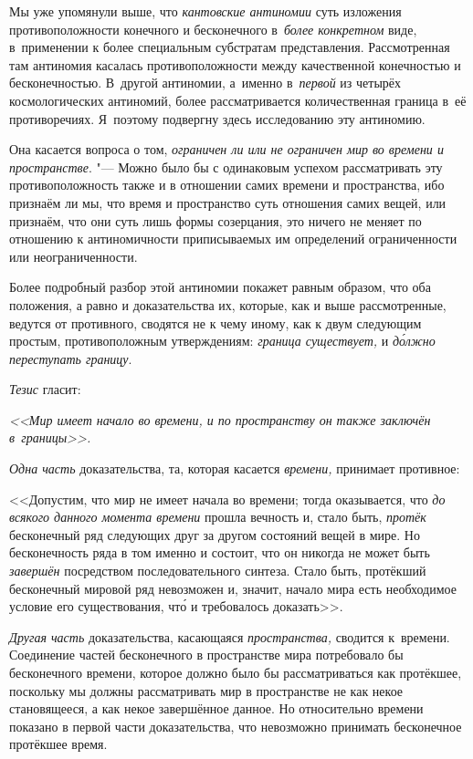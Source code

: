 Мы уже упомянули выше, что {\em кантовские антиномии} суть изложения
противоположности конечного и бесконечного в~{\em более конкретном} виде,
в~применении к более специальным субстратам представления. Рассмотренная там
антиномия касалась противоположности между качественной конечностью и
бесконечностью. В~другой антиномии, а~именно в~{\em первой} из четырёх
космологических антиномий, более рассматривается количественная граница в~её
противоречиях. Я~поэтому подвергну здесь исследованию эту антиномию.

Она касается вопроса о том,
{\em ограничен ли или не ограничен мир во времени и пространстве}. "--- Можно
было бы с одинаковым успехом рассматривать эту противоположность также
и в отношении самих времени и пространства, ибо признаём ли мы, что время
и пространство суть отношения самих вещей, или признаём, что они суть лишь
формы созерцания, это ничего не меняет по отношению к антиномичности
приписываемых им определений ограниченности или неограниченности.

Более подробный разбор этой антиномии покажет равным образом, что оба
положения, а равно и доказательства их, которые, как и выше рассмотренные,
ведутся от противного, сводятся не к чему иному, как к двум следующим простым,
противоположным утверждениям: {\em граница существует,} и
{\em д\'{о}лжно переступать границу}.

{\em Тезис} гласит:

{\em <<Мир имеет начало во времени, и по пространству он
также заключён в~границы>>.}

{\em Одна часть} доказательства, та, которая касается
{\em времени,} принимает противное:

<<Допустим, что мир не имеет начала во времени; тогда оказывается, что
{\em до всякого данного момента времени} прошла вечность и, стало быть,
{\em протёк} бесконечный ряд следующих друг за другом состояний вещей в мире.
Но бесконечность ряда в том именно и состоит, что он никогда не может быть
{\em завершён} посредством последовательного синтеза. Стало быть, протёкший
бесконечный мировой ряд невозможен и, значит, начало мира есть необходимое
условие его существования, чт\'{о} и требовалось доказать>>.

{\em Другая часть} доказательства, касающаяся {\em пространства,} сводится
к~времени. Соединение частей бесконечного в пространстве мира потребовало бы
бесконечного времени, которое должно было бы рассматриваться как протёкшее,
поскольку мы должны рассматривать мир в пространстве не как некое становящееся,
а как некое завершённое данное. Но относительно времени показано в первой части
доказательства, что невозможно принимать бесконечное протёкшее время.

